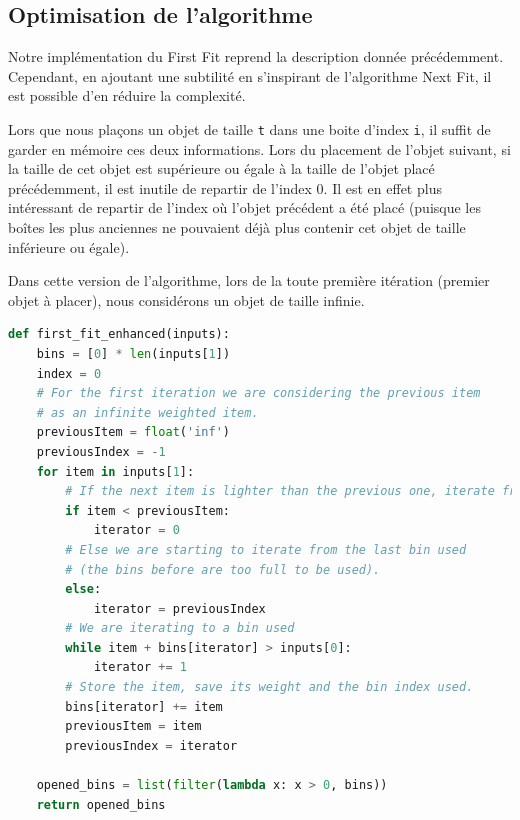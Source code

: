 \documentclass{article}
\begin{document}
\subsection{Optimisation de l'algorithme}
Notre implémentation du First Fit reprend la description donnée précédemment. Cependant, en ajoutant une subtilité en s'inspirant de l'algorithme Next Fit, il est possible d'en réduire la complexité.

Lors que nous plaçons un objet de taille \texttt{t} dans une boite d'index \texttt{i}, il suffit de garder en mémoire ces deux informations.
Lors du placement de l'objet suivant, si la taille de cet objet est supérieure ou égale à la taille de l'objet placé précédemment,
il est inutile de repartir de l'index 0. Il est en effet plus intéressant de repartir de l'index où l'objet précédent a été placé (puisque les boîtes les plus anciennes ne pouvaient déjà plus contenir cet objet de taille inférieure ou égale).

Dans cette version de l'algorithme, lors de la toute première itération (premier objet à placer), nous considérons un objet de taille infinie.

\begin{lstlisting}[language=Python, frame=single]
def first_fit_enhanced(inputs):
    bins = [0] * len(inputs[1])
    index = 0
    # For the first iteration we are considering the previous item
    # as an infinite weighted item.
    previousItem = float('inf')
    previousIndex = -1
    for item in inputs[1]:
        # If the next item is lighter than the previous one, iterate from 0
        if item < previousItem:
            iterator = 0
        # Else we are starting to iterate from the last bin used
        # (the bins before are too full to be used).
        else:
            iterator = previousIndex
        # We are iterating to a bin used
        while item + bins[iterator] > inputs[0]:
            iterator += 1
        # Store the item, save its weight and the bin index used.
        bins[iterator] += item
        previousItem = item
        previousIndex = iterator

    opened_bins = list(filter(lambda x: x > 0, bins))
    return opened_bins
\end{lstlisting}


\end{document}
